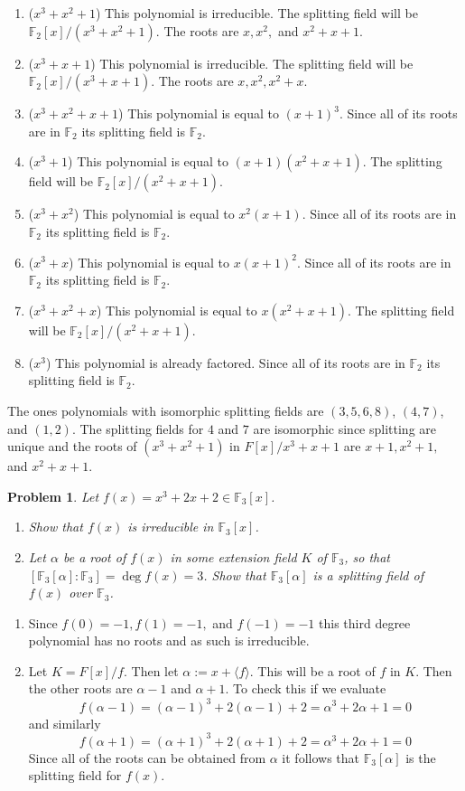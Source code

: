 \documentclass[10pt]{article}
\newcommand{\sk}{\vskip 10mm}
\newcommand{\bb}[1]{\mathbb{#1}}
\theoremstyle{plain}
\newtheorem{problem}{Problem}
\theoremstyle{remark}
\begin{document}
\begin{enumerate}
\item ($x^3+x^2+1$) This polynomial is irreducible. The splitting field will
  be $\bb{F}_2[x]/(x^3+x^2+1)$. The roots are $x,x^2,$ and $x^2+x+1$.
\item ($x^3+x+1$) This polynomial is irreducible. The splitting field will
  be $\bb{F}_2[x]/(x^3+x+1)$. The roots are $x,x^2,x^2+x$.
\item ($x^3+x^2+x+1$) This polynomial is equal to $(x+1)^3$. Since all of its roots
  are in $\bb{F}_2$ its splitting field is $\bb{F}_2$.
\item ($x^3+1$) This polynomial is equal to $(x+1)(x^2+x+1)$. The splitting
  field will be $\bb{F}_2[x]/(x^2+x+1)$.
\item ($x^3+x^2$) This polynomial is equal to $x^2(x+1)$. Since all of its roots
  are in $\bb{F}_2$ its splitting field is $\bb{F}_2$.
\item ($x^3+x$) This polynomial is equal to $x(x+1)^2$. Since all of its roots
  are in $\bb{F}_2$ its splitting field is $\bb{F}_2$.
\item ($x^3+x^2+x$) This polynomial is equal to $x(x^2+x+1)$. The splitting field
  will be $\bb{F}_2[x]/(x^2+x+1)$.
\item ($x^3$) This polynomial is already factored. Since all of its roots
  are in $\bb{F}_2$ its splitting field is $\bb{F}_2$.
\end{enumerate}

The ones polynomials with isomorphic splitting fields are $(3,5,6,8)$, $(4,7)$, and $(1,2)$.
The splitting fields for $4$ and $7$ are isomorphic since splitting are unique and the roots
of $(x^3+x^2+1)$ in $F[x]/x^3+x+1$ are $x+1,x^2+1,$ and $x^2+x+1$.

\sk

\begin{problem}
  Let $f(x) = x^3 + 2x + 2 \in \mathbb{F}_3[x]$.
\begin{enumerate}
    \item Show that $f(x)$ is irreducible in $\mathbb{F}_3[x]$.
    \item Let $\alpha$ be a root of $f(x)$ in some extension field $K$
      of $\mathbb{F}_3$, so that
      $[\mathbb{F}_3[\alpha]: \mathbb{F}_3] = \deg f(x) = 3$.
      Show that $\mathbb{F}_3[\alpha]$ is a splitting field of $f(x)$
      over $\mathbb{F}_3$.
\end{enumerate}
\end{problem}

\begin{enumerate}
\item Since $f(0)=-1, f(1)=-1,$ and $f(-1)=-1$ this third degree polynomial has no
  roots and as such is irreducible.
\item Let $K=F[x]/f$. Then let $\alpha:=x+\langle f\rangle$. This will be a root of $f$ in
  $K$. Then the other roots are $\alpha-1$ and $\alpha+1$. To check this if we evaluate
  \[f(\alpha-1)=(\alpha-1)^3+2(\alpha-1)+2=\alpha^3+2\alpha+1=0\]
  and similarly
  \[f(\alpha+1)=(\alpha+1)^3+2(\alpha+1)+2=\alpha^3+2\alpha+1=0 \]
  Since all of the roots can be obtained from $\alpha$ it follows that $\bb{F}_3[\alpha]$
  is the splitting field for $f(x)$.
\end{enumerate}
\end{document}
